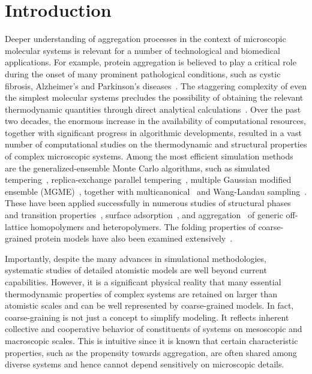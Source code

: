 \documentclass[12pt]{report}
\begin{document}
\section{Introduction}
%
Deeper understanding of aggregation processes in the context
of microscopic molecular systems is relevant for a number of 
technological and biomedical applications. For example,
protein aggregation is believed to play a critical role during
the onset of many prominent pathological conditions, 
such as cystic fibrosis, Alzheimer's and Parkinson's
diseases~\cite{Selkoe,Chiti}. The staggering complexity of even the 
simplest molecular systems precludes the possibility of obtaining 
the relevant thermodynamic quantities through direct analytical 
calculations~\cite{Bachmann2014}. Over the past two decades, 
the enormous increase in the availability of computational resources, 
together with significant progress in algorithmic developments, 
resulted in a vast number of computational studies on the thermodynamic 
and structural properties of complex microscopic systems. 
Among the most efficient simulation methods are the
generalized-ensemble Monte Carlo algorithms, such as
simulated tempering~\cite{marinari,lyubartsev},
replica-exchange parallel tempering~\cite{sw1,geyer1,huku1,huku2}, 
multiple Gaussian modified ensemble (MGME)~\cite{Neuhaus2006}, 
together with
multicanonical~\cite{muca1a,muca1b,muca2,muca3,muca4,Bachmann2013}
and Wang-Landau sampling~\cite{wl1,wl2,wl3}. 
These have been applied successfully in numerous studies of 
structural phases and transition
properties~\cite{Schnabel2009,bf1,bf2,grass2,vbj1,strauch1,svbj1,%
taylorRange1, taylorRange2,seaton3,semisslb1,Koci2015}, surface
adsorption~\cite{bj4,prellberg1,paul1,mbj1,liang1,allen1,vb1,ywli1,%
mjb4,vgb1}, and
aggregation~\cite{jbj1,Junghans2008,Junghans2009,Junghans2011,%
Zieren2014,Zieren2015} of generic off-lattice homopolymers and
heteropolymers. The folding properties of coarse-grained protein models
have also been examined
extensively~\cite{dill1,still1,still2,som1,hsu1,bj1,ssbj1}.
 
Importantly, despite the many advances in simulational
methodologies, systematic studies of detailed atomistic
models are well beyond current capabilities. 
However, it is a significant physical reality that many 
essential thermodynamic properties of complex systems are 
retained on larger than atomistic scales and can be well represented 
by coarse-grained models. In fact, coarse-graining is not just a concept
to simplify modeling. It reflects inherent collective and cooperative
behavior of constituents of systems on mesoscopic and macroscopic scales. 
This is intuitive since it is known that certain characteristic
properties, such as the propensity towards aggregation, are often shared
among diverse systems and hence cannot depend sensitively on microscopic
details.
 
\end{document}
